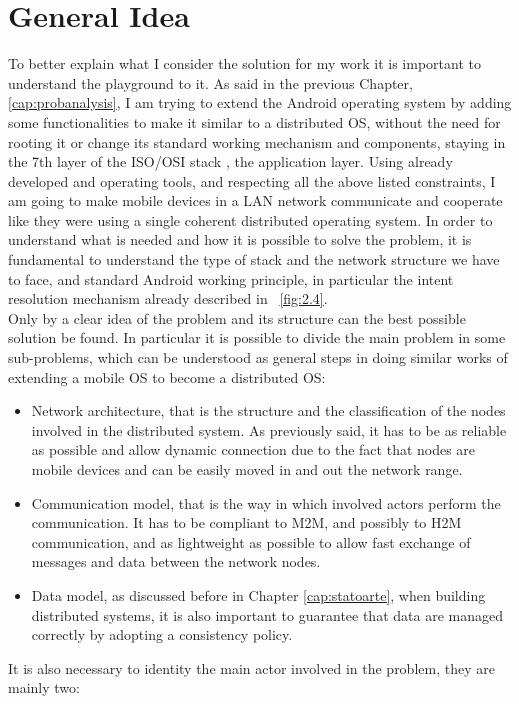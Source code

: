 \section{General Idea}
\par To better explain what I consider the solution for my work it is important to understand the playground to it. As said in the previous Chapter, \ref{cap:probanalysis}, I
am trying to extend the Android operating system by adding some functionalities to make it similar to a distributed OS, without the need for rooting it or change its standard working mechanism and components, staying in the 7th layer of the ISO/OSI stack , the application layer. Using already developed and operating tools, and respecting all the above listed constraints, I am going to make mobile devices in a LAN network communicate and cooperate like they were using a single coherent distributed operating system.
In order to understand what is needed and how it is possible to solve the problem, it is fundamental to understand the type of stack and the network structure we have to face, and standard Android working principle, in particular the intent resolution mechanism already described in \figurename~\ref{fig:2.4}.\\
Only by a clear idea of the problem and its structure can the best possible solution be found. In particular it is possible to divide the main problem in some sub-problems, which can be understood as general steps in doing similar works of extending a mobile OS to become a distributed OS:
\begin{itemize}
	\item Network architecture, that is the structure and the classification of the nodes involved in the distributed system. As previously said, it has to be as reliable  as possible and allow dynamic connection due to the fact that nodes are mobile devices and can be easily moved in and out the network range.
	\item Communication model, that is the way in which involved actors perform the communication. It has to be compliant to M2M, and possibly to H2M communication, and as lightweight as possible to allow fast exchange of messages and data between the network nodes.
	\item Data model, as discussed before in Chapter \ref{cap:statoarte}, when building distributed systems, it is also important to guarantee that data are managed correctly by adopting a consistency policy.
\end{itemize}
It is also necessary to identity the main actor involved in the problem, they are mainly two:
